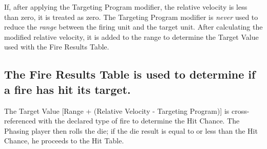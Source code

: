 If, after applying the Targeting Program modifier, the relative
velocity is less than zero, it is treated as zero. The Targeting
Program modifier is \emph{never} used to reduce the \emph{range}
between the firing unit and the target unit. After calculating the
modified relative velocity, it is added to the range to determine the
Target Value used with the Fire Results Table.

\subsection[Fire Results Table]{The Fire Results Table is used to
  determine if a fire has 
  hit its target.}
\label{sec:fire-results-table}



The Target Value [Range + (Relative Velocity - Targeting Program)] is
cross-referenced with the declared type of fire to determine the Hit
Chance. The Phasing player then rolls the die; if the die result is
equal to or less than the Hit Chance, he proceeds to the Hit Table.


\begin{table}[htbp]
  \centering
\end{table}


